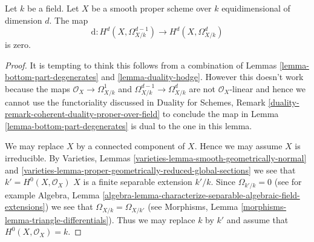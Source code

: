 \begin{lemma}
\label{lemma-top-part-degenerates}
Let $k$ be a field. Let $X$ be a smooth proper scheme over $k$
equidimensional of dimension $d$. The map
$$
\text{d} : H^d(X, \Omega^{d - 1}_{X/k}) \to H^d(X, \Omega^d_{X/k})
$$
is zero.
\end{lemma}

\begin{proof}
It is tempting to think this follows from a combination of
Lemmas \ref{lemma-bottom-part-degenerates} and \ref{lemma-duality-hodge}.
However this doesn't work because the maps $\mathcal{O}_X \to \Omega^1_{X/k}$
and $\Omega^{d - 1}_{X/k} \to \Omega^d_{X/k}$ are not $\mathcal{O}_X$-linear
and hence we cannot use the functoriality discussed in
Duality for Schemes, Remark
\ref{duality-remark-coherent-duality-proper-over-field}
to conclude the map in Lemma \ref{lemma-bottom-part-degenerates}
is dual to the one in this lemma.

\medskip\noindent
We may replace $X$ by a connected component of $X$. Hence we may assume
$X$ is irreducible. By
Varieties, Lemmas \ref{varieties-lemma-smooth-geometrically-normal} and
\ref{varieties-lemma-proper-geometrically-reduced-global-sections}
we see that $k' = H^0(X, \mathcal{O}_X)$ $X$ is a finite separable
extension $k'/k$. Since $\Omega_{k'/k} = 0$
(see for example Algebra, Lemma
\ref{algebra-lemma-characterize-separable-algebraic-field-extensions})
we see that $\Omega_{X/k} = \Omega_{X/k'}$
(see Morphisms, Lemma \ref{morphisms-lemma-triangle-differentials}).
Thus we may replace $k$ by $k'$ and assume that $H^0(X, \mathcal{O}_X) = k$.


\end{proof}
